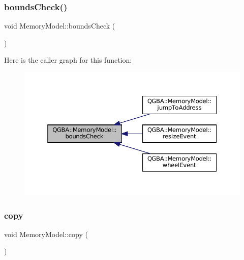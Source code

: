 \mbox{\label{class_q_g_b_a_1_1_memory_model_a9a82532b4e9a1b4801f5fe1476c36c3a}} 
\subsubsection{\texorpdfstring{bounds\+Check()}{boundsCheck()}}
{\footnotesize\ttfamily void Memory\+Model\+::bounds\+Check (\begin{DoxyParamCaption}{ }\end{DoxyParamCaption})\hspace{0.3cm}{\ttfamily [private]}}

Here is the caller graph for this function\+:
\nopagebreak
\begin{figure}[H]
\begin{center}
\leavevmode
\includegraphics[width=350pt]{class_q_g_b_a_1_1_memory_model_a9a82532b4e9a1b4801f5fe1476c36c3a_icgraph}
\end{center}
\end{figure}
\mbox{\label{class_q_g_b_a_1_1_memory_model_a70a88aa956fa14bd0a6f4cec769f7bb3}} 
\subsubsection{\texorpdfstring{copy}{copy}}
{\footnotesize\ttfamily void Memory\+Model\+::copy (\begin{DoxyParamCaption}{ }\end{DoxyParamCaption})\hspace{0.3cm}{\ttfamily [slot]}}

